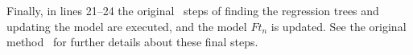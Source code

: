 \documentclass[preprint,review,10pt,3p]{elsarticle}
\begin{document}
Finally, in lines 21--24 the original \lambdamart\ steps of finding the regression trees and updating the model are executed, and the model $Ft_n$ is updated. See the original method~\cite{wu2010lambdamart} for further details about these final steps.
 



\end{document}

